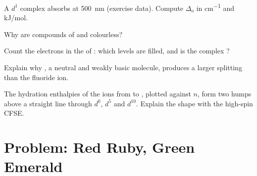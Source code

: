 \begin{exercise}[$\star\star$]\label{exo:b2:ligand-field:8}
A $d^1$ complex absorbs at \qty{500}{nm} (exercise data). Compute $\Delta_o$ in \unit{cm^{-1}} and
\unit{kJ/mol}.
\end{exercise}

\begin{exercise}[$\star\star$]\label{exo:b2:ligand-field:9}
Why are compounds of  and  colourless?
\end{exercise}

\begin{exercise}[$\star\star\star$]\label{exo:b2:ligand-field:10}
Count the electrons in the  of : which levels are filled,
and is the complex ?
\end{exercise}

\begin{exercise}[$\star\star\star$]\label{exo:b2:ligand-field:11}
Explain why , a neutral and weakly basic molecule, produces a larger splitting than
the fluoride ion.
\end{exercise}

\begin{exercise}[$\star\star\star$]\label{exo:b2:ligand-field:12}
The hydration enthalpies of the  ions from  to , plotted against $n$, form
two humps above a straight line through $d^0$, $d^5$ and $d^{10}$. Explain the shape with the
high-spin CFSE.
\end{exercise}

\section{Problem: Red Ruby, Green Emerald}

